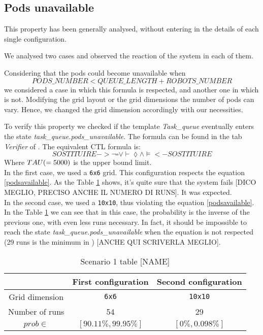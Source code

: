 \subsection{Pods unavailable} \label{podsunavailable}
This property has been generally analysed, without entering in the details of each single configuration.

We analysed two cases and observed the reaction of the system in each of them.

Considering that the pods could become unavailable when 
\begin{equation} \label{podsavailable}
    PODS\_NUMBER < QUEUE\_LENGTH + ROBOTS\_NUMBER
\end{equation}
we considered a case in which this formula is respected, and another one in which is not. Modifying the grid layout or the grid dimensions the number of pods can vary. Hence, we changed the grid dimension accordingly with our necessities.

To verify this property we checked if the template \emph{Task\_queue} eventually enters the state \emph{task\_queue.pods\_unavailable}. The formula can be found in the tab \emph{Verifier} of \UPPAAL. The equivalent CTL formula is:
\begin{equation}
    SOSTITUIRE ->  \lnot \square \vee \vdash \lozenge \wedge \models  <- SOSTITUIRE
\end{equation}
Where $TAU (= 5000)$ is the upper bound limit.
\\

In the first case, we used a \texttt{6x6} grid. This configuration respects the equation \ref{podsavailable}. As the Table \ref{tab:tabpodsunavailable} shows, it's quite sure that the system fails [DICO MEGLIO, PRECISO ANCHE IL NUMERO DI RUNS]. It was expected.
\\

In the second case, we used a \texttt{10x10}, thus violating the equation \ref{podsavailable}. In the Table \ref{tab:tabpodsunavailable} we can see that in this case, the probability is the inverse of the previous one, with even less runs necessary. In fact, it should be impossible to reach the state \emph{task\_queue.pods\_unavailable} when the equation is not respected (29 runs is the minimum in \UPPAAL) [ANCHE QUI SCRIVERLA MEGLIO].

\begin{table}[h]
    \centering
        \begin{tabular}{| c || c c |} 
            \hline
             & First configuration & Second configuration \\ [0.5ex] 
            \hline\hline
            Grid dimension & \texttt{6x6} & \texttt{10x10} \\
            Number of runs & 54 & 29 \\
            \hline\hline
            $prob \in$ &  $[90.11\%,99.95\%]$ & $[0\%,0.098\%]$\\ [0.5ex] 
            \hline
        \end{tabular}
        \caption{Scenario 1 table [NAME]}
        \label{tab:tabpodsunavailable}
    \end{table}

